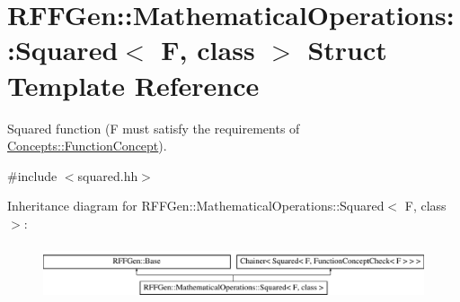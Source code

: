 \hypertarget{structRFFGen_1_1MathematicalOperations_1_1Squared}{\section{R\-F\-F\-Gen\-:\-:Mathematical\-Operations\-:\-:Squared$<$ F, class $>$ Struct Template Reference}
\label{structRFFGen_1_1MathematicalOperations_1_1Squared}
}


Squared function (F must satisfy the requirements of \hyperlink{structRFFGen_1_1Concepts_1_1FunctionConcept}{Concepts\-::\-Function\-Concept}).  




{\ttfamily \#include $<$squared.\-hh$>$}

Inheritance diagram for R\-F\-F\-Gen\-:\-:Mathematical\-Operations\-:\-:Squared$<$ F, class $>$\-:\begin{figure}[H]
\begin{center}
\leavevmode
\includegraphics[height=1.642229cm]{structRFFGen_1_1MathematicalOperations_1_1Squared}
\end{center}
\end{figure}
